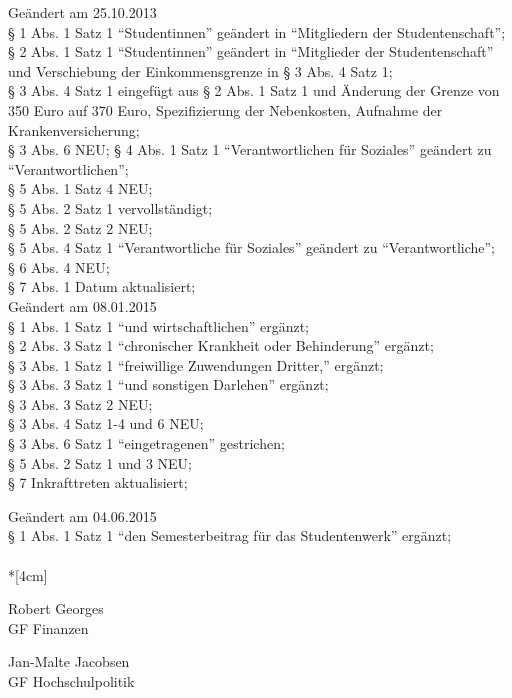 Geändert am 25.10.2013 \\
§ 1 Abs. 1 Satz 1 "`Studentinnen"' geändert in "`Mitgliedern der Studentenschaft"'; \\
§ 2 Abs. 1 Satz 1 "`Studentinnen"' geändert in "`Mitglieder der Studentenschaft"' und Verschiebung der Einkommensgrenze in § 3 Abs. 4 Satz 1; \\
§ 3 Abs. 4 Satz 1 eingefügt aus § 2 Abs. 1 Satz 1 und Änderung der Grenze von 350 Euro auf 370 Euro, Spezifizierung der Nebenkosten, Aufnahme der Krankenversicherung; \\
§ 3 Abs. 6 NEU;
§ 4 Abs. 1 Satz 1 "`Verantwortlichen für Soziales"' geändert zu "`Verantwortlichen"';\\
§ 5 Abs. 1 Satz 4 NEU;\\
§ 5 Abs. 2 Satz 1 vervollständigt;\\
§ 5 Abs. 2 Satz 2 NEU;\\
§ 5 Abs. 4 Satz 1 "`Verantwortliche für Soziales"' geändert zu "`Verantwortliche"';\\
§ 6 Abs. 4 NEU;\\
§ 7 Abs. 1 Datum aktualisiert;\\

Geändert am 08.01.2015 \\
§ 1 Abs. 1 Satz 1 "`und wirtschaftlichen"' ergänzt;\\
§ 2 Abs. 3 Satz 1 "`chronischer Krankheit oder Behinderung"' ergänzt;\\
§ 3 Abs. 1 Satz 1 "`freiwillige Zuwendungen Dritter,"' ergänzt;\\
§ 3 Abs. 3 Satz 1 "`und sonstigen Darlehen"' ergänzt;\\
§ 3 Abs. 3 Satz 2 NEU;\\
§ 3 Abs. 4 Satz 1-4 und 6 NEU;\\
§ 3 Abs. 6 Satz 1 "`eingetragenen"' gestrichen;\\
§ 5 Abs. 2 Satz 1 und 3 NEU;\\
§ 7 Inkrafttreten aktualisiert;

Geändert am 04.06.2015 \\
§ 1 Abs. 1 Satz 1 "`den Semesterbeitrag für das Studentenwerk"' ergänzt;\\


\normalsize
~\\*[4cm]
\begin{center}
\hspace*{\fill}
\parbox{7cm}{Robert Georges\\GF Finanzen}
\hfill\parbox{7cm}{Jan-Malte Jacobsen\\GF Hochschulpolitik}
\hspace*{\fill}
\end{center}